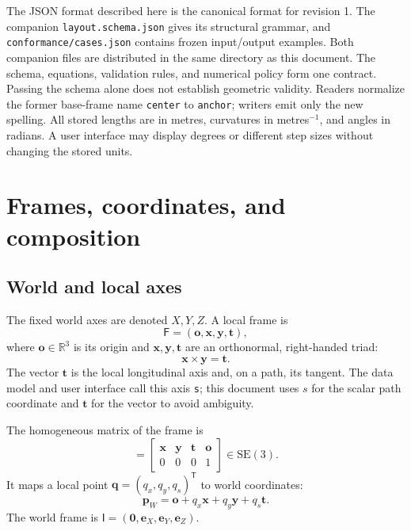 \documentclass[11pt,a4paper]{article}
\newcommand{\R}{\mathbb{R}}
\newcommand{\SE}{\mathrm{SE}(3)}
\newcommand{\Frame}{\mathsf{F}}
\newcommand{\identity}{\mathsf{I}}
\begin{document}
The JSON format described here is the canonical format for revision 1. The
companion \texttt{layout.schema.json} gives its structural grammar, and
\texttt{conformance/cases.json} contains frozen input/output examples.
Both companion files are distributed in the same directory as this document.
The schema, equations, validation rules, and numerical policy form one contract.
Passing the schema alone does not establish geometric validity.
Readers normalize the former base-frame name \texttt{center} to
\texttt{anchor}; writers emit only the new spelling.  All stored lengths are in metres, curvatures in
metres$^{-1}$, and angles in radians.  A user interface may display degrees or
different step sizes without changing the stored units.

\section{Frames, coordinates, and composition}

\subsection{World and local axes}

The fixed world axes are denoted $X,Y,Z$.  A local frame is
\begin{equation}
  \Frame=(\mathbf{o},\mathbf{x},\mathbf{y},\mathbf{t}),
\end{equation}
where $\mathbf{o}\in\R^3$ is its origin and
$\mathbf{x},\mathbf{y},\mathbf{t}$ are an orthonormal, right-handed triad:
\begin{equation}
  \mathbf{x}\times\mathbf{y}=\mathbf{t}.
\end{equation}
The vector $\mathbf{t}$ is the local longitudinal axis and, on a path, its
tangent.  The data model and user interface call this axis \texttt{s}; this
document uses $s$ for the scalar path coordinate and $\mathbf{t}$ for the vector
to avoid ambiguity.

The homogeneous matrix of the frame is
\begin{equation}
  [\Frame]
  =
  \begin{bmatrix}
    \mathbf{x} & \mathbf{y} & \mathbf{t} & \mathbf{o}\\
    0&0&0&1
  \end{bmatrix}
  \in\SE.
  \label{eq:frame-matrix}
\end{equation}
It maps a local point $\mathbf{q}=(q_x,q_y,q_s)^\mathsf{T}$ to world
coordinates:
\begin{equation}
  \mathbf{p}_{W}
  =\mathbf{o}+q_x\mathbf{x}+q_y\mathbf{y}+q_s\mathbf{t}.
  \label{eq:local-to-world}
\end{equation}
The world frame is
$\identity=(\mathbf{0},\mathbf{e}_X,\mathbf{e}_Y,\mathbf{e}_Z)$.
\end{document}
